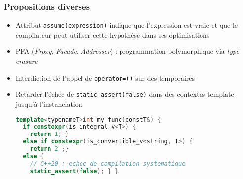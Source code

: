 \documentclass[C++.tex]{subfiles}
\begin{document}
\begin{frame}[fragile]
	\frametitle{Propositions diverses}
	\begin{itemize}
		\item Attribut \lstinline|assume(expression)| indique que l'expression est vraie et que le compilateur peut utiliser cette hypothèse dans ses optimisations
		\item PFA (\textit{Proxy}, \textit{Facade}, \textit{Addresser}) : programmation polymorphique via \textit{type erasure}


		\item Interdiction de l'appel de \lstinline|operator=()| sur des temporaires


		\item Retarder l'échec de \lstinline|static_assert(false)| dans des contextes template jusqu'à l'instanciation

		\begin{lstlisting}[language=C++]
template<typenameT>int my_func(constT&) {
  if constexpr(is_integral_v<T>) { 
    return 1; } 
  else if constexpr(is_convertible_v<string, T>) { 
    return 2 ;}
  else {
    // C++20 : echec de compilation systematique
    static_assert(false); } }\end{lstlisting}


	\end{itemize}
\end{frame}
\end{document}
